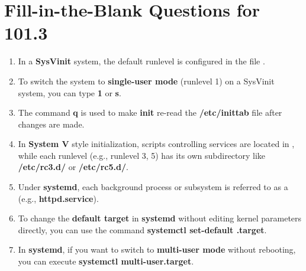 \documentclass[a4paper]{report}
\begin{document}
\newpage
\section*{Fill-in-the-Blank Questions for 101.3}

\begin{enumerate}[1.]

\item In a \textbf{SysVinit} system, the default runlevel is configured in the file \textbf{\underline{\hspace{2cm}}}.

\item To switch the system to \textbf{single-user mode} (runlevel 1) on a SysVinit system, you can type \textbf{\underline{\hspace{2cm}} 1} or \textbf{\underline{\hspace{2cm}} s}.

\item The command \textbf{\underline{\hspace{2cm}} q} is used to make \textbf{init} re-read the \textbf{/etc/inittab} file after changes are made.

\item In \textbf{System V} style initialization, scripts controlling services are located in \textbf{\underline{\hspace{2cm}}}, while each runlevel (e.g., runlevel 3, 5) has its own subdirectory like \textbf{/etc/rc3.d/} or \textbf{/etc/rc5.d/}.

\item Under \textbf{systemd}, each background process or subsystem is referred to as a \textbf{\underline{\hspace{2cm}}} (e.g., \textbf{httpd.service}).

\item To change the \textbf{default target} in \textbf{systemd} without editing kernel parameters directly, you can use the command \textbf{systemctl set-default \underline{\hspace{2cm}}.target}.

\item In \textbf{systemd}, if you want to switch to \textbf{multi-user mode} without rebooting, you can execute \textbf{systemctl \underline{\hspace{2cm}} multi-user.target}.


\end{enumerate}
\end{document}
